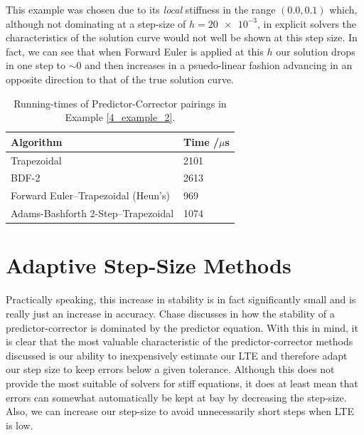 \documentclass[12pt, twoside]{report}
\theoremstyle{plain}
\theoremstyle{definition}
\theoremstyle{definition}
\begin{document}
        This example was chosen due to its \textit{local} stiffness in the 
        range $(0.0, 0.1)$ which, although not dominating at a step-size of 
        $h=\num{20e-3}$, in explicit solvers the characteristics of the solution
        curve would not well be shown at this step size. In fact, we can see that
        when Forward Euler is applied at this $h$ our solution drops in one step
        to ${\sim}0$ and then increases in a psuedo-linear fashion advancing in an
        opposite direction to that of the true solution curve. 

        \begin{table}
            \centering
                \begin{tabular}[H]{| l | l |}
                    \hline
                    Algorithm & Time /$\mu$s \\ \hline
                    Trapezoidal & 2101 \\ \hline
                    BDF-2 & 2613 \\ \hline
                    Forward Euler--Trapezoidal (Heun's) & 969 \\ \hline
                    Adams-Bashforth 2-Step--Trapezoidal & 1074 \\
                    \hline
                \end{tabular}
            \label{4_im_pc_runtimes}
            \caption{Running-times of Predictor-Corrector pairings in Example
            \ref{4_example_2}.}
        \end{table}

    \section{Adaptive Step-Size Methods}
    \label{4_adaptive}
        Practically speaking, this increase in stability is in fact 
        significantly small and is really just an increase in accuracy. Chase
        discusses in \cite{chase} how the stability of a predictor-corrector
        is dominated by the predictor equation. With this in mind, it is 
        clear that the most valuable characteristic of the predictor-corrector
        methods discussed is our ability to inexpensively estimate our LTE
        and therefore adapt our step size to keep errors below a given 
        tolerance. Although this does not provide the most suitable of solvers
        for stiff equations, it does at least mean that errors can somewhat 
        automatically be kept at bay by decreasing the step-size. Also, we can
        increase our step-size to avoid unnecessarily short steps when LTE is 
        low.
\end{document}

